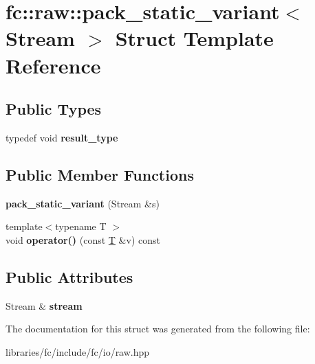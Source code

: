 \hypertarget{structfc_1_1raw_1_1pack__static__variant}{}\section{fc\+:\+:raw\+:\+:pack\+\_\+static\+\_\+variant$<$ Stream $>$ Struct Template Reference}
\label{structfc_1_1raw_1_1pack__static__variant}
\subsection*{Public Types}
\begin{DoxyCompactItemize}
\item 
\mbox{\label{structfc_1_1raw_1_1pack__static__variant_a5ea959a6c10c405e89b025cab12162c3}} 
typedef void {\bfseries result\+\_\+type}
\end{DoxyCompactItemize}
\subsection*{Public Member Functions}
\begin{DoxyCompactItemize}
\item 
\mbox{\label{structfc_1_1raw_1_1pack__static__variant_a6a63274f18818ef6e44b0366bc4774d0}} 
{\bfseries pack\+\_\+static\+\_\+variant} (Stream \&s)
\item 
\mbox{\label{structfc_1_1raw_1_1pack__static__variant_a998dd814917112234d68eb743ba779e5}} 
{\footnotesize template$<$typename T $>$ }\\void {\bfseries operator()} (const \mbox{\hyperlink{struct_t}{T}} \&v) const
\end{DoxyCompactItemize}
\subsection*{Public Attributes}
\begin{DoxyCompactItemize}
\item 
\mbox{\label{structfc_1_1raw_1_1pack__static__variant_aafaa02947d93280fe5da1e5172aa9479}} 
Stream \& {\bfseries stream}
\end{DoxyCompactItemize}


The documentation for this struct was generated from the following file\+:\begin{DoxyCompactItemize}
\item 
libraries/fc/include/fc/io/raw.\+hpp\end{DoxyCompactItemize}
